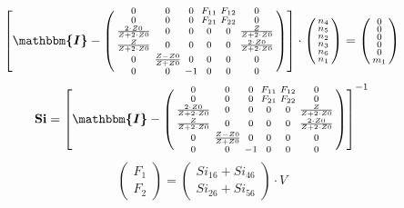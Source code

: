 \documentclass[10pt]{article} \usepackage{amsmath} \usepackage{bbold}
\begin{document}
\[ \left[ \boldsymbol{\mathbbm{I}}  - \left(\begin{smallmatrix} 0 & 0
& 0 & F_{11} & F_{12} & 0 \\ 0 & 0 & 0 & F_{21} & F_{22} & 0 \\
\frac{2\cdot Z0}{Z+2\cdot Z0} & 0 & 0 & 0 & 0 & \frac{Z}{Z+2\cdot Z0}
\\ \frac{Z}{Z+2\cdot Z0} & 0 & 0 & 0 & 0 & \frac{2\cdot Z0}{Z+2\cdot
Z0} \\ 0 & \frac{ Z -Z0}{ Z +Z0} & 0 & 0 & 0 & 0 \\ 0 & 0 & -1 & 0 & 0
& 0 \end{smallmatrix}\right)\right] \cdot \left(\begin{smallmatrix}
n_{4} \\ n_{5} \\ n_{2} \\ n_{3} \\ n_{6} \\ n_{1}
\end{smallmatrix}\right) = \left(\begin{smallmatrix} 0 \\ 0 \\ 0 \\ 0
\\ 0 \\ m_{1} \end{smallmatrix}\right) \]
\[ \mathbf{Si} = \left[ \boldsymbol{\mathbbm{I}}  -
\left(\begin{smallmatrix} 0 & 0 & 0 & F_{11} & F_{12} & 0 \\ 0 & 0 & 0
& F_{21} & F_{22} & 0 \\ \frac{2\cdot Z0}{Z+2\cdot Z0} & 0 & 0 & 0 & 0
& \frac{Z}{Z+2\cdot Z0} \\ \frac{Z}{Z+2\cdot Z0} & 0 & 0 & 0 & 0 &
\frac{2\cdot Z0}{Z+2\cdot Z0} \\ 0 & \frac{ Z -Z0}{ Z +Z0} & 0 & 0 & 0
& 0 \\ 0 & 0 & -1 & 0 & 0 & 0 \end{smallmatrix}\right) \right]^{-1} \]
\[ \left(\begin{array}{c} F_{1} \\ F_{2}
\end{array}\right)=\left(\begin{smallmatrix} Si_{16} + Si_{46} \\
Si_{26} + Si_{56} \end{smallmatrix}\right)\cdot V \]
\end{document}
